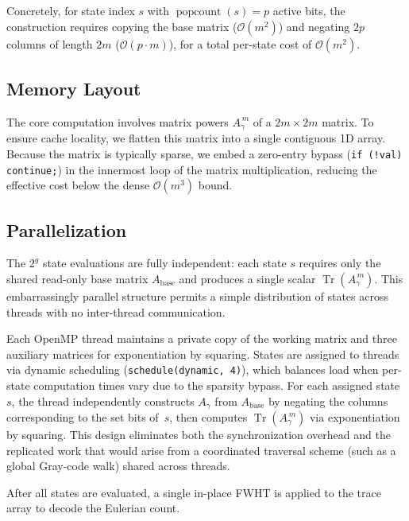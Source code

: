 \documentclass[acmsmall,review]{acmart}
\newcommand{\bigO}{\mathcal{O}}
\DeclareMathOperator{\Tr}{Tr}
\begin{document}
	Concretely, for state index $s$ with $\operatorname{popcount}(s) = p$ active bits, the construction requires copying the base matrix ($\bigO(m^2)$) and negating $2p$ columns of length $2m$ ($\bigO(p \cdot m)$), for a total per-state cost of $\bigO(m^2)$.
	
	\subsection{Memory Layout}
	\label{subsec:cache_aware}
	The core computation involves matrix powers $A_\gamma^{\,m}$ of a $2m \times 2m$ matrix. To ensure cache locality, we flatten this matrix into a single contiguous 1D array. Because the matrix is typically sparse, we embed a zero-entry bypass (\texttt{if (!val) continue;}) in the innermost loop of the matrix multiplication, reducing the effective cost below the dense $\bigO(m^3)$ bound.
	
	\subsection{Parallelization}
	\label{subsec:thread_local}
	The $2^g$ state evaluations are fully independent: each state $s$ requires only the shared read-only base matrix $A_{\text{base}}$ and produces a single scalar $\Tr(A_\gamma^{\,m})$. This embarrassingly parallel structure permits a simple distribution of states across threads with no inter-thread communication.
	
	Each OpenMP thread maintains a private copy of the working matrix and three auxiliary matrices for exponentiation by squaring. States are assigned to threads via dynamic scheduling (\texttt{schedule(dynamic, 4)}), which balances load when per-state computation times vary due to the sparsity bypass. For each assigned state~$s$, the thread independently constructs $A_\gamma$ from $A_{\text{base}}$ by negating the columns corresponding to the set bits of~$s$, then computes $\Tr(A_\gamma^{\,m})$ via exponentiation by squaring. This design eliminates both the synchronization overhead and the replicated work that would arise from a coordinated traversal scheme (such as a global Gray-code walk) shared across threads.
	
	After all states are evaluated, a single in-place FWHT is applied to the trace array to decode the Eulerian count.
	
\end{document}
